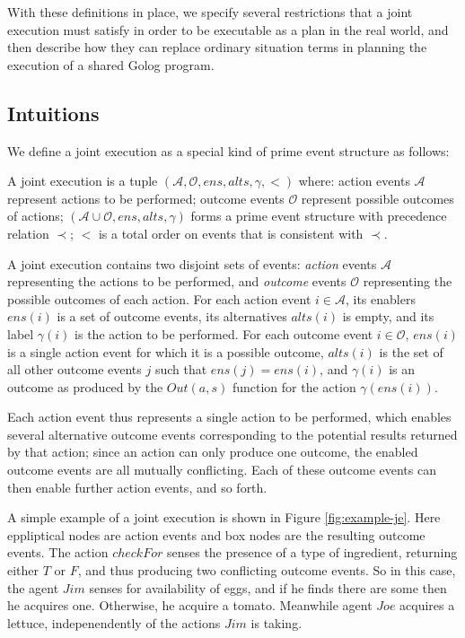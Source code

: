 With these definitions in place, we specify several restrictions that
a joint execution must satisfy in order to be executable as a plan
in the real world, and then describe how they can replace ordinary
situation terms in planning the execution of a shared Golog program.


\subsection{Intuitions}

We define a joint execution as a special kind of prime event structure
as follows:

\begin{defnL}
 A joint execution is a tuple $(\mathcal{A},\mathcal{O},ens,alts,\gamma,<)$
where: action events $\mathcal{A}$ represent actions to be performed;
outcome events $\mathcal{O}$ represent possible outcomes of actions;
$(\mathcal{A}\cup\mathcal{O},ens,alts,\gamma)$ forms a prime event
structure with precedence relation $\prec$; $<$ is a total order
on events that is consistent with $\prec$. 
\end{defnL}
A joint execution contains two disjoint sets of events: \emph{action}
events $\mathcal{A}$ representing the actions to be performed, and
\emph{outcome} events $\mathcal{O}$ representing the possible outcomes
of each action. For each action event $i\in\mathcal{A}$, its enablers
$ens(i)$ is a set of outcome events, its alternatives $alts(i)$
is empty, and its label $\gamma(i)$ is the action to be performed.
For each outcome event $i\in\mathcal{O}$, $ens(i)$ is a single action
event for which it is a possible outcome, $alts(i)$ is the set of
all other outcome events $j$ such that $ens(j)=ens(i)$, and $\gamma(i)$
is an outcome as produced by the $Out(a,s)$ function for the action
$\gamma(ens(i))$.

Each action event thus represents a single action to be performed,
which enables several alternative outcome events corresponding to
the potential results returned by that action; since an action can
only produce one outcome, the enabled outcome events are all mutually
conflicting. Each of these outcome events can then enable further
action events, and so forth.

A simple example of a joint execution is shown in Figure \ref{fig:example-je}.
Here eppliptical nodes are action events and box nodes are the resulting
outcome events. The action $checkFor$ senses the presence of a type
of ingredient, returning either $T$ or $F$, and thus producing two
conflicting outcome events. So in this case, the agent $Jim$ senses
for availability of eggs, and if he finds there are some then he acquires
one. Otherwise, he acquire a tomato. Meanwhile agent $Joe$ acquires
a lettuce, indepenendently of the actions $Jim$ is taking.


